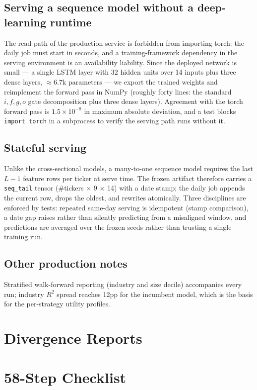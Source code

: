 \documentclass[11pt]{article}
\begin{document}
\subsection{Serving a sequence model without a deep-learning runtime}
The read path of the production service is forbidden from importing torch: the
daily job must start in seconds, and a training-framework dependency in the
serving environment is an availability liability. Since the deployed network is
small --- a single LSTM layer with 32 hidden units over 14 inputs plus three
dense layers, $\approx 6.7$k parameters --- we export the trained weights and
reimplement the forward pass in NumPy (roughly forty lines: the standard
$i,f,g,o$ gate decomposition plus three dense layers). Agreement with the torch
forward pass is $1.5\times10^{-8}$ in maximum absolute deviation, and a test
blocks \texttt{import torch} in a subprocess to verify the serving path runs
without it.

\subsection{Stateful serving}
Unlike the cross-sectional models, a many-to-one sequence model requires the
last $L-1$ feature rows per ticker at serve time. The frozen artifact therefore
carries a \texttt{seq\_tail} tensor (\#tickers $\times$ 9 $\times$ 14) with a
date stamp; the daily job appends the current row, drops the oldest, and
rewrites atomically. Three disciplines are enforced by tests: repeated
same-day serving is idempotent (stamp comparison), a date gap raises rather than
silently predicting from a misaligned window, and predictions are averaged over
the frozen seeds rather than trusting a single training run.

\subsection{Other production notes}
Stratified walk-forward reporting (industry and size decile) accompanies every
run; industry $R^2$ spread reaches 12pp for the incumbent model, which is the
basis for the per-strategy utility profiles.

\appendix
\section{Divergence Reports}         %
\section{58-Step Checklist}          %
\end{document}
